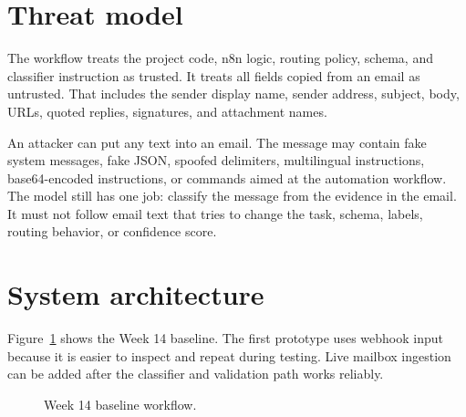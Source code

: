 \documentclass[11pt,a4paper]{article}
\begin{document}
\section{Threat model}

The workflow treats the project code, n8n logic, routing policy, schema, and classifier instruction as trusted. It treats all fields copied from an email as untrusted. That includes the sender display name, sender address, subject, body, URLs, quoted replies, signatures, and attachment names.

An attacker can put any text into an email. The message may contain fake system messages, fake JSON, spoofed delimiters, multilingual instructions, base64-encoded instructions, or commands aimed at the automation workflow. The model still has one job: classify the message from the evidence in the email. It must not follow email text that tries to change the task, schema, labels, routing behavior, or confidence score.

\section{System architecture}

Figure~\ref{fig:architecture} shows the Week 14 baseline. The first prototype uses webhook input because it is easier to inspect and repeat during testing. Live mailbox ingestion can be added after the classifier and validation path works reliably.

\begin{figure}[h]
\centering
{}
\caption{Week 14 baseline workflow.}
\label{fig:architecture}
\end{figure}
\end{document}

